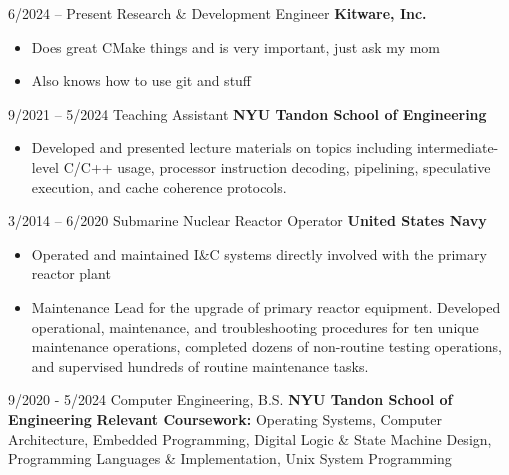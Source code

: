 \documentclass[9pt]{developercv} %
\begin{document}
\vspace{-10 pt}
\begin{entrylist}
	\entry
	{6/2024 -- Present}
	{Research \& Development Engineer}
	{\textbf{Kitware, Inc.}}
	{\vspace{-10pt}
		\begin{itemize}[noitemsep,topsep=0pt,parsep=0pt,partopsep=0pt, leftmargin=-1pt]
			\item Does great CMake things and is very important, just ask my mom
			\item Also knows how to use git and stuff
		\end{itemize}
	}
	\entry
	{9/2021 -- 5/2024}
	{Teaching Assistant}
	{\textbf{NYU Tandon School of Engineering}}
	{\vspace{-10pt}
		\begin{itemize}[noitemsep,topsep=0pt,parsep=0pt,partopsep=0pt, leftmargin=-1pt]
			\item Developed and presented lecture materials on topics including
			      intermediate-level C/C++ usage, processor instruction decoding,
			      pipelining, speculative execution, and cache coherence protocols.
		\end{itemize}
	}
	\entry
	{3/2014 -- 6/2020}
	{Submarine Nuclear Reactor Operator}
	{\textbf{United States Navy}}
	{\vspace{-10pt}
		\begin{itemize}[noitemsep,topsep=0pt,parsep=0pt,partopsep=0pt, leftmargin=-1pt]
			\item Operated and maintained I\&C systems directly involved with the
			      primary reactor plant
			\item Maintenance Lead for the upgrade of primary reactor equipment.
			      Developed operational, maintenance, and troubleshooting procedures
			      for ten unique maintenance operations, completed dozens of
			      non-routine testing operations, and supervised hundreds of
			      routine maintenance tasks.

		\end{itemize}
	}
\end{entrylist}

\vspace{-10 pt}
\begin{entrylist}
	\entry
	{9/2020 - 5/2024}
	{Computer Engineering, B.S.}
	{\textbf{NYU Tandon School of Engineering}}
	{
		\textbf{Relevant Coursework:} Operating Systems,
		Computer Architecture, Embedded Programming,
		Digital Logic \& State Machine Design,
		Programming Languages \& Implementation, Unix System Programming
	}
\end{entrylist}
\end{document}
